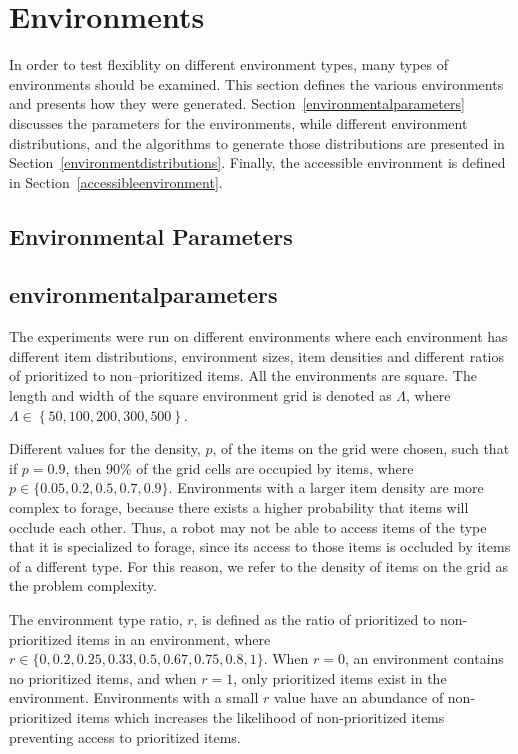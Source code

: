 \section{Environments}
\label{experimentenvironments}

In order to test flexiblity on different environment types, many types of environments should be examined. This section defines the various environments and presents how they were generated. Section~\ref{environmentalparameters} discusses the parameters for the environments, while different environment distributions, and the algorithms to generate those distributions are presented in Section~\ref{environmentdistributions}. Finally, the accessible environment is defined in Section~\ref{accessibleenvironment}.

\subsection{Environmental Parameters}
\subsection{environmentalparameters}
The experiments were run on different environments where each environment has different item distributions, environment sizes, item densities and different ratios of prioritized to non--prioritized items. All the environments are square. The length and width of the square environment grid is denoted as $\Lambda$, where $\Lambda\in \left\{ 50, 100, 200, 300, 500\right\}$.

Different values for the density, $p$, of the items on the grid were chosen, such that if $p=0.9$, then 90\% of the grid cells are occupied by items, where $p\in \{ 0.05,\allowbreak 0.2,\allowbreak 0.5,\allowbreak 0.7,\allowbreak 0.9\}$. Environments with a larger item density are more complex to forage, because there exists a higher probability that items will occlude each other. Thus, a robot may not be able to access items of the type that it is specialized to forage, since its access to those items is occluded by items of a different type. For this reason, we refer to the density of items on the grid as the problem complexity.

The environment type ratio, $r$, is defined as the ratio of prioritized to non-prioritized items in an environment, where $r\in \{0,\allowbreak 0.2,\allowbreak 0.25,\allowbreak 0.33,\allowbreak 0.5,\allowbreak 0.67,\allowbreak 0.75,\allowbreak 0.8, 1\}$. When $r=0$, an environment contains no prioritized items, and when $r=1$, only prioritized items exist in the environment. Environments with a small $r$ value have an abundance of non-prioritized items which increases the likelihood of non-prioritized items preventing access to prioritized items.

